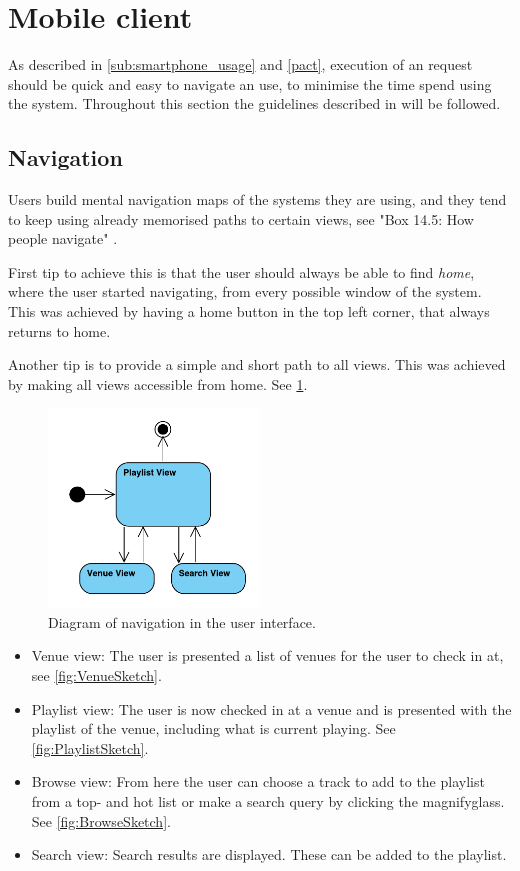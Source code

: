 \section{Mobile client}

As described in \cref{sub:smartphone_usage} and \cref{pact}, execution
of an request should be quick and easy to navigate an use, to minimise
the time spend using the system. Throughout this section the
guidelines described in  will be followed.

\subsection{Navigation}

Users build mental navigation maps of the systems they are using, and
they tend to keep using already memorised paths to certain views, see
"Box 14.5: How people navigate" \cite{DEB} . 

First tip to achieve this is that the user should always be able to find \emph{home}, where the user started navigating, from every possible window of the system. This was achieved by having a home button in the top left corner, that always returns to home.

Another tip is to provide a simple and short path to all views. This
was achieved by making all views accessible from home. See \cref{fig:UserInterface}.

\begin{figure}[hbtp]
  \centering
  \includegraphics[width=0.5\textwidth]{Images/UserInterface.pdf}
  \caption{Diagram of navigation in the user interface.}\label{fig:UserInterface}
\end{figure}

\begin{itemize}
\item Venue view: The user is presented a list of venues for the user to check in at, see \cref{fig:VenueSketch}.
\item Playlist view: The user is now checked in at a venue and is presented with the playlist of the venue, including what is current playing. See \cref{fig:PlaylistSketch}.
\item Browse view: From here the user can choose a track to add to the playlist from a top- and hot list or make a search query by clicking the magnifyglass. See \cref{fig:BrowseSketch}.
\item Search view: Search results are displayed. These can be added to
  the playlist.
\end{itemize}


